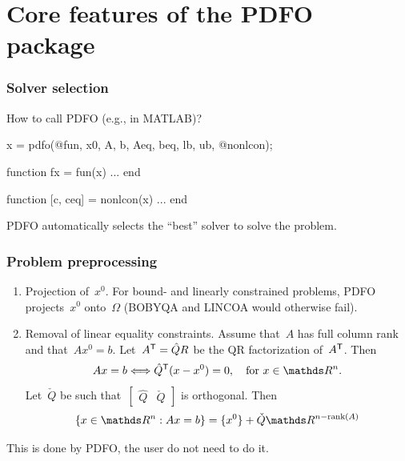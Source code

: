 \documentclass{polyu-presentation}
\begin{document}
\section{Core features of the PDFO package}

\begin{frame}[fragile]
    \frametitle{Solver selection}

    \begin{block}{How to call PDFO (e.g., in MATLAB)?}
        \begin{lstmatlab}
            x = pdfo(@fun, x0, A, b, Aeq, beq, lb, ub, @nonlcon);
        
            function fx = fun(x)
            ...
            end
        
            function [c, ceq] = nonlcon(x)
            ...
            end
        \end{lstmatlab}
    \end{block}

    \medskip

    PDFO \alert{automatically selects} the \enquote{best} solver to solve the problem.
\end{frame}

\begin{frame}
    \frametitle{Problem preprocessing}

	\begin{enumerate}
        \item \alert{Projection of~$x^0$}.
        For bound- and linearly constrained problems, PDFO projects~$x^0$ onto~$\Omega$ (BOBYQA and LINCOA would otherwise fail).
        \item \alert{Removal of linear equality constraints}.
        Assume that~$A$ has full column rank and that~$A x^0 = b$.
        Let~$A^{\mathsf{T}} = \hat{Q} R$ be the \alert{QR factorization} of~$A^{\mathsf{T}}$.
        Then
        \begin{equation*}
            A x = b \Longleftrightarrow \hat{Q}^{\T} (x - x^0) = 0, \quad \text{for~$x \in \R^n$}.
        \end{equation*}
        Let~$\check{Q}$ be such that~$\begin{bmatrix} \hat{Q} & \check{Q} \end{bmatrix}$ is \alert{orthogonal}.
        Then
        \begin{equation*}
            \set{x \in \R^n : A x = b} = \set{x^0} + \check{Q} \R^{n - \rank(A)}
        \end{equation*}
    \end{enumerate}

    \medskip

    \begin{block}{}
        This is done by PDFO, the user do \alert{not need} to do it.
    \end{block}
\end{frame}
\end{document}
